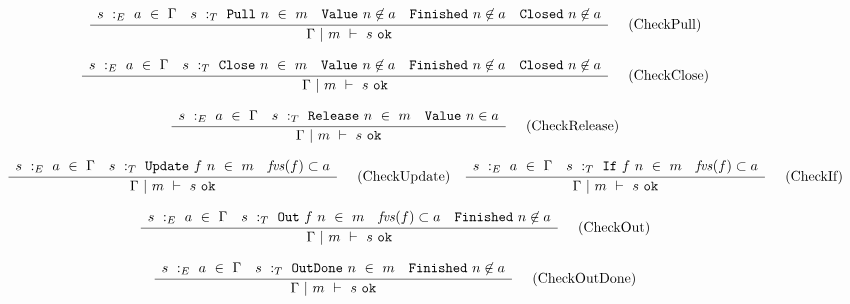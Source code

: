 \begin{figure*}

$$
\frac {\displaystyle 
    \begin{array}{lcccr}
        s~:_E~ a ~\in~ \Gamma                    &
        s ~:_T~ \mathtt{Pull}~n ~\in~m    &
        \mathtt{Value}~n \not\in a             &
        \mathtt{Finished}~n \not\in a          &
        \mathtt{Closed}~n \not\in a
    \end{array}
} {\displaystyle  
    \Gamma ~|~ m ~\vdash~ s~\mathtt{ok}
} \ 
\quad
\textrm{(CheckPull)}
$$

$$
\frac {\displaystyle 
    \begin{array}{lcccr}
        s~:_E~ a ~\in~ \Gamma                    &
        s ~:_T~ \mathtt{Close}~n ~\in~m    &
        \mathtt{Value}~n \not\in a             &
        \mathtt{Finished}~n \not\in a          &
        \mathtt{Closed}~n \not\in a             
    \end{array}
} {\displaystyle  
    \Gamma ~|~ m ~\vdash~ s~\mathtt{ok}
} \ 
\quad
\textrm{(CheckClose)}
$$

$$
\frac {\displaystyle 
    \begin{array}{lcr}
        s~:_E~ a ~\in~ \Gamma                        &
        s ~:_T~ \mathtt{Release}~n ~\in~m    &
        \mathtt{Value}~n \in a
    \end{array}
} {\displaystyle  
    \Gamma ~|~ m ~\vdash~ s~\mathtt{ok}
} \ 
\quad
\textrm{(CheckRelease)}
$$

$$
\frac {\displaystyle 
    \begin{array}{lcr}
        s~:_E~ a ~\in~ \Gamma                        &
        s ~:_T~ \mathtt{Update}~f~n ~\in~m    &
        \mathit{fvs}(f) \subset a
    \end{array}
} {\displaystyle  
    \Gamma ~|~ m ~\vdash~ s~\mathtt{ok}
} \ 
\quad
\textrm{(CheckUpdate)}
\quad
\frac {\displaystyle 
    \begin{array}{lcr}
        s~:_E~ a ~\in~ \Gamma                        &
        s ~:_T~ \mathtt{If}~f~n ~\in~m    &
        \mathit{fvs}(f) \subset a
    \end{array}
} {\displaystyle  
    \Gamma ~|~ m ~\vdash~ s~\mathtt{ok}
} \ 
\quad
\textrm{(CheckIf)}
$$

$$
\frac {\displaystyle 
    \begin{array}{lccr}
        s~:_E~ a ~\in~ \Gamma                      &
        s ~:_T~ \mathtt{Out}~f~n ~\in~m    &
        \mathit{fvs}(f) \subset a                   &
        \mathtt{Finished}~n \not\in a
    \end{array}
} {\displaystyle  
    \Gamma ~|~ m ~\vdash~ s~\mathtt{ok}
} \ 
\quad
\textrm{(CheckOut)}
$$

$$
\frac {\displaystyle 
    \begin{array}{lcr}
        s~:_E~ a ~\in~ \Gamma                            &
        s ~:_T~ \mathtt{OutDone}~n ~\in~m     &
        \mathtt{Finished}~n    \not\in a
    \end{array}
} {\displaystyle  
    \Gamma ~|~ m ~\vdash~ s~\mathtt{ok}
} \ 
\quad
\textrm{(CheckOutDone)}
$$


\end{figure*}
